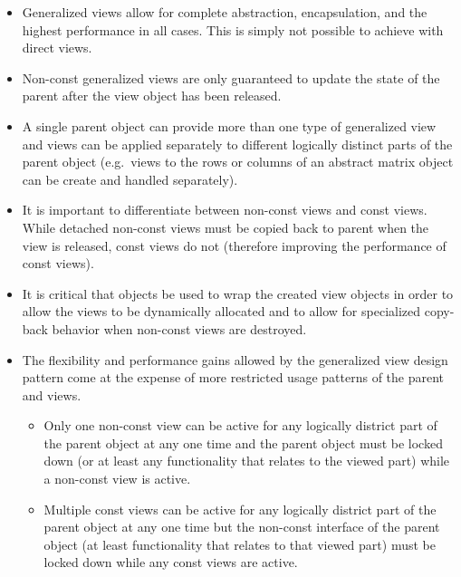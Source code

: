 \documentclass[pdf,ps2pdf,11pt]{SANDreport}
\begin{document}
\begin{itemize}

{}\item Generalized views allow for complete abstraction,
encapsulation, and the highest performance in all cases.  This is
simply not possible to achieve with direct views.

{}\item Non-const generalized views are only guaranteed to update the
state of the parent after the view object has been released.

{}\item A single parent object can provide more than one type of
generalized view and views can be applied separately to different
logically distinct parts of the parent object (e.g.\ views to the rows
or columns of an abstract matrix object can be create and handled
separately).

{}\item It is important to differentiate between non-const views and
const views.  While detached non-const views must be copied back to
parent when the view is released, const views do not (therefore
improving the performance of const views).

{}\item It is critical that {} objects be used to wrap the
created view objects in order to allow the views to be dynamically
allocated and to allow for specialized copy-back behavior when
non-const views are destroyed.

{}\item The flexibility and performance gains allowed by the
generalized view design pattern come at the expense of more restricted usage
patterns of the parent and views.

  \begin{itemize}

  {}\item Only one non-const view can be active for any logically
  district part of the parent object at any one time and the parent
  object must be locked down (or at least any functionality that
  relates to the viewed part) while a non-const view is active.

  {}\item Multiple const views can be active for any logically
  district part of the parent object at any one time but the non-const
  interface of the parent object (at least functionality that relates
  to that viewed part) must be locked down while any const views are
  active.

  \end{itemize}

\end{itemize}
\end{document}
